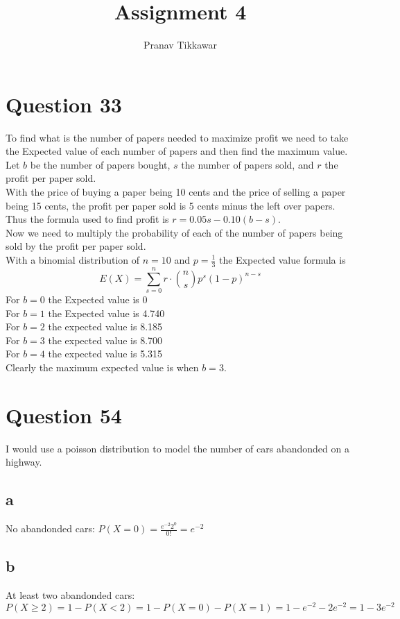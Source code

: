 \documentclass{article}
\author{Pranav Tikkawar}
\title{Assignment 4}
\begin{document}
\maketitle
\section*{Question 33}
To find what is the number of papers needed to maximize profit we need to take the Expected value of each number of papers and then find the maximum value.\\
Let $b$ be the number of papers bought, $s$ the number of papers sold, and $r$ the profit per paper sold.\\
With the price of buying a paper being 10 cents and the price of selling a paper being 15 cents, the profit per paper sold is 5 cents minus the left over papers.\\
Thus the formula used to find profit is $r = 0.05s - 0.10(b-s)$.\\ 
Now we need to multiply the probability of each of the number of papers being sold by the profit per paper sold.\\
With a binomial distribution of $n=10$ and $p=\frac{1}{3}$ the Expected value formula is 
$$ E(X) = \sum_{s=0}^{n} r \cdot \binom{n}{s}p^s(1-p)^{n-s}$$
For $b = 0$ the Expected value is 0\\
For $b = 1$ the Expected value is 4.740\\
For $b = 2$ the expected value is 8.185\\
For $b = 3$ the expected value is 8.700\\
For $b = 4$ the expected value is 5.315\\
Clearly the maximum expected value is when $b = 3$.\\

\section*{Question 54}
I would use a poisson distribution to  model the number of cars abandonded on a highway.\\
\subsection*{a}
No abandonded cars: $P(X=0) = \frac{e^{-2}2^0}{0!} = e^{-2}$

\subsection*{b}
At least two abandonded cars: $P(X \geq 2) = 1 - P(X < 2) = 1 - P(X = 0) - P(X = 1) = 1 - e^{-2} - 2e^{-2} = 1 - 3e^{-2}$
\end{document}
